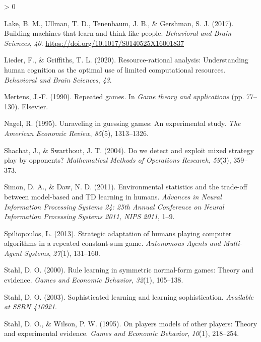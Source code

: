 \documentclass[
  english,
  man,floatsintext]{apa6}
\newlength{\cslhangindent}
\newenvironment{CSLReferences}[2] %
 {%
  \setlength{\parindent}{0pt}
  \ifodd #1 \everypar{\setlength{\hangindent}{\cslhangindent}}\ignorespaces\fi
  \ifnum #2 > 0
  \setlength{\parskip}{#2\baselineskip}
  \fi
 }%
 {}
\begin{document}
\begin{CSLReferences}{1}{0}
\leavevmode\hypertarget{ref-Lake2017}{}%
Lake, B. M., Ullman, T. D., Tenenbaum, J. B., \& Gershman, S. J. (2017). {Building machines that learn and think like people}. \emph{Behavioral and Brain Sciences}, \emph{40}. \url{https://doi.org/10.1017/S0140525X16001837}

\leavevmode\hypertarget{ref-lieder2020resource}{}%
Lieder, F., \& Griffiths, T. L. (2020). Resource-rational analysis: Understanding human cognition as the optimal use of limited computational resources. \emph{Behavioral and Brain Sciences}, \emph{43}.

\leavevmode\hypertarget{ref-mertens1990repeated}{}%
Mertens, J.-F. (1990). {Repeated games}. In \emph{Game theory and applications} (pp. 77--130). Elsevier.

\leavevmode\hypertarget{ref-nagel1995unraveling}{}%
Nagel, R. (1995). Unraveling in guessing games: An experimental study. \emph{The American Economic Review}, \emph{85}(5), 1313--1326.

\leavevmode\hypertarget{ref-shachat2004we}{}%
Shachat, J., \& Swarthout, J. T. (2004). {Do we detect and exploit mixed strategy play by opponents?} \emph{Mathematical Methods of Operations Research}, \emph{59}(3), 359--373.

\leavevmode\hypertarget{ref-Simon_Daw_11}{}%
Simon, D. A., \& Daw, N. D. (2011). {Environmental statistics and the trade-off between model-based and TD learning in humans}. \emph{Advances in Neural Information Processing Systems 24: 25th Annual Conference on Neural Information Processing Systems 2011, NIPS 2011}, 1--9.

\leavevmode\hypertarget{ref-spiliopoulos2013strategic}{}%
Spiliopoulos, L. (2013). {Strategic adaptation of humans playing computer algorithms in a repeated constant-sum game}. \emph{Autonomous Agents and Multi-Agent Systems}, \emph{27}(1), 131--160.

\leavevmode\hypertarget{ref-stahl2000rule}{}%
Stahl, D. O. (2000). Rule learning in symmetric normal-form games: Theory and evidence. \emph{Games and Economic Behavior}, \emph{32}(1), 105--138.

\leavevmode\hypertarget{ref-stahl2003sophisticated}{}%
Stahl, D. O. (2003). Sophisticated learning and learning sophistication. \emph{Available at SSRN 410921}.

\leavevmode\hypertarget{ref-stahl1995players}{}%
Stahl, D. O., \& Wilson, P. W. (1995). {On players models of other players: Theory and experimental evidence}. \emph{Games and Economic Behavior}, \emph{10}(1), 218--254.


\end{CSLReferences}
\end{document}
